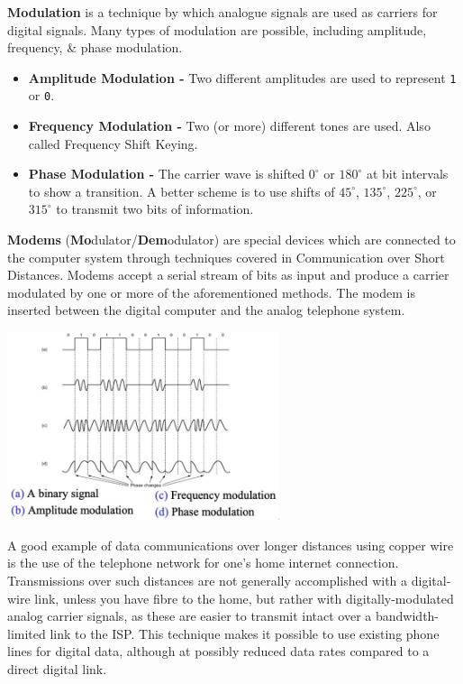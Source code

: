 \documentclass[11pt]{article}
\begin{document}
\textbf{Modulation} is a technique by which analogue signals are used as carriers for digital signals. 
Many types of modulation are possible, including amplitude, frequency, \& phase modulation. 
\begin{itemize}
    \item   \textbf{Amplitude Modulation -} Two different amplitudes are used to represent \verb|1| or \verb|0|. 
    \item   \textbf{Frequency Modulation -} Two (or more) different tones are used. Also called Frequency Shift Keying. 
    \item   \textbf{Phase Modulation -} The carrier wave is shifted $0^\circ$ or $180^\circ$ at bit intervals to show a transition. 
            A better scheme is to use shifts of $45^\circ$, $135^\circ$, $225^\circ$, or $315^\circ$ to transmit two bits of information. 
\end{itemize}

\textbf{Modems} (\textbf{Mo}dulator/\textbf{Dem}odulator) are special devices which are connected to the computer system 
through techniques covered in Communication over Short Distances. 
Modems accept a serial stream of bits as input and produce a carrier modulated by one or more of the aforementioned methods. 
The modem is inserted between the digital computer and the analog telephone system.

\begin{center}
    \includegraphics[width=0.6\textwidth]{modems1.png}
\end{center}

A good example of data communications over longer distances using copper wire is the use of the telephone network for one's 
home internet connection. 
Transmissions over such distances are not generally accomplished with a digital-wire link, unless you have fibre to the home, 
but rather with digitally-modulated analog carrier signals, as these are easier to transmit intact over a bandwidth-limited link 
to the ISP. 
This technique makes it possible to use existing phone lines for digital data, although at possibly reduced data rates 
compared to a direct digital link. 
\end{document}
